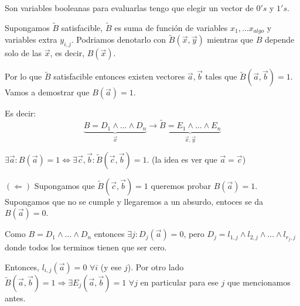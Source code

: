 \documentclass[12pt,a4paper]{article}
\begin{document}
Son variables booleanas para evaluarlas tengo que elegir un vector de $0's$ y $1's$.
\medskip

Supongamos $\widetilde{B}$ satisfacible, $\widetilde{B}$ es suma de función de variables 
$x_{1},\ldots x_{algo}$ y variables extra $y_{i,j}$. Podriamos denotarlo con 
$\widetilde{B}(\overrightarrow{x}, \overrightarrow{y})$ mientras que $B$ depende 
solo de las $\overrightarrow{x}$, es decir, $B(\overrightarrow{x})$.
\medskip

Por lo que $\widetilde{B}$ satisfacible entonces existen vectores $\overrightarrow{a}, \overrightarrow{b}$
tales que $\widetilde{B}(\overrightarrow{a}, \overrightarrow{b}) = 1$. Vamos a demostrar 
que $B(\overrightarrow{a}) = 1$.
\medskip

Es decir:
$$\underbrace{B = D_{1} \wedge \ldots \wedge D_{n}}_{\overrightarrow{x}} \to \underbrace{\widetilde{B} = E_{1} \wedge \ldots \wedge E_{n}}_{\overrightarrow{x}, \overrightarrow{y}}$$

$\exists \overrightarrow{a}: B(\overrightarrow{a}) = 1 \Leftrightarrow \exists \overrightarrow{c}, \overrightarrow{b} : \widetilde{B}(\overrightarrow{c}, \overrightarrow{b}) = 1$.
(la idea es ver que $\overrightarrow{a} = \overrightarrow{c}$)
\medskip

$(\Leftarrow)$ Supongamos que $\widetilde{B}(\overrightarrow{c}, \overrightarrow{b}) =1$ 
queremos probar $B(\overrightarrow{a}) = 1$. Supongamos que no se cumple y llegaremos 
a un absurdo, entoces se da $B(\overrightarrow{a}) = 0$.
\medskip

Como $B = D_{1} \wedge \ldots \wedge D_{n}$ entonces $\exists j : D_{j}(\overrightarrow{a}) = 0$, 
pero $D_{j} = l_{1,j} \wedge l_{2,j} \wedge \ldots \wedge l_{r_{j},j}$ donde todos 
los terminos tienen que ser cero.
\medskip

Entonces, $l_{i,j}(\overrightarrow{a}) = 0\,\, \forall i$ (y ese $j$). Por otro 
lado $\widetilde{B}(\overrightarrow{a}, \overrightarrow{b}) = 1 \Rightarrow \exists E_{j}(\overrightarrow{a},\overrightarrow{b}) = 1\,\, \forall j$
en particular para ese $j$ que mencionamos antes.
\medskip
\end{document}

